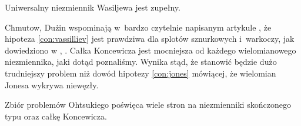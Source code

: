 \begin{conjecture}
    \label{con:vassilliev}
    Uniwersalny niezmiennik Wasiljewa jest zupełny.
\end{conjecture}

Chmutow, Dużin wspominają w~bardzo czytelnie napisanym artykule \cite{chmutov05}, że hipoteza \ref{con:vassilliev} jest prawdziwa dla splotów sznurkowych i~warkoczy, jak dowiedziono w \cite{kohno87}, \cite{barnatandror95}.
%
%
Całka Koncewicza jest mocniejsza od każdego wielomianowego niezmiennika, jaki dotąd poznaliśmy.
Wynika stąd, że stanowić będzie dużo trudniejszy problem niż dowód hipotezy \ref{con:jones} mówiącej, że wielomian Jonesa wykrywa niewęzły.

Zbiór problemów Ohtsukiego \cite[s. 398-444]{ohtsuki02} poświęca wiele stron na niezmienniki skończonego typu oraz całkę Koncewicza.


